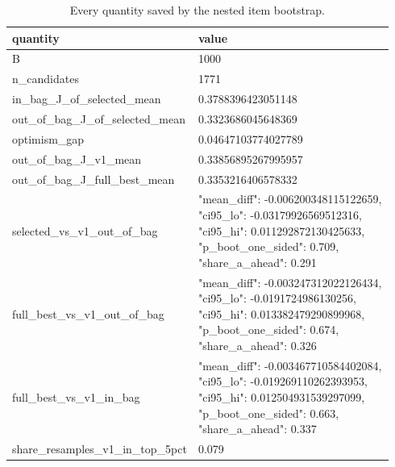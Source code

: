 \scriptsize
\setlength{\tabcolsep}{3pt}
\begin{longtable}{p{0.281\linewidth}p{0.661\linewidth}}
\caption{Every quantity saved by the nested item bootstrap.}\label{tab:nested_selection}\\
\toprule
quantity & value \\
\midrule
B & 1000 \\
n\_\allowbreak{}candidates & 1771 \\
in\_\allowbreak{}bag\_\allowbreak{}J\_\allowbreak{}of\_\allowbreak{}selected\_\allowbreak{}mean & 0.3788396423051148 \\
out\_\allowbreak{}of\_\allowbreak{}bag\_\allowbreak{}J\_\allowbreak{}of\_\allowbreak{}selected\_\allowbreak{}mean & 0.3323686045648369 \\
optimism\_\allowbreak{}gap & 0.04647103774027789 \\
out\_\allowbreak{}of\_\allowbreak{}bag\_\allowbreak{}J\_\allowbreak{}v1\_\allowbreak{}mean & 0.33856895267995957 \\
out\_\allowbreak{}of\_\allowbreak{}bag\_\allowbreak{}J\_\allowbreak{}full\_\allowbreak{}best\_\allowbreak{}mean & 0.3353216406578332 \\
selected\_\allowbreak{}vs\_\allowbreak{}v1\_\allowbreak{}out\_\allowbreak{}of\_\allowbreak{}bag & {"mean\_\allowbreak{}diff": -0.006200348115122659, "ci95\_\allowbreak{}lo": -0.03179926569512316, "ci95\_\allowbreak{}hi": 0.011292872130425633, "p\_\allowbreak{}boot\_\allowbreak{}one\_\allowbreak{}sided": 0.709, "share\_\allowbreak{}a\_\allowbreak{}ahead": 0.291} \\
full\_\allowbreak{}best\_\allowbreak{}vs\_\allowbreak{}v1\_\allowbreak{}out\_\allowbreak{}of\_\allowbreak{}bag & {"mean\_\allowbreak{}diff": -0.003247312022126434, "ci95\_\allowbreak{}lo": -0.0191724986130256, "ci95\_\allowbreak{}hi": 0.013382479290899968, "p\_\allowbreak{}boot\_\allowbreak{}one\_\allowbreak{}sided": 0.674, "share\_\allowbreak{}a\_\allowbreak{}ahead": 0.326} \\
full\_\allowbreak{}best\_\allowbreak{}vs\_\allowbreak{}v1\_\allowbreak{}in\_\allowbreak{}bag & {"mean\_\allowbreak{}diff": -0.003467710584402084, "ci95\_\allowbreak{}lo": -0.019269110262393953, "ci95\_\allowbreak{}hi": 0.012504931539297099, "p\_\allowbreak{}boot\_\allowbreak{}one\_\allowbreak{}sided": 0.663, "share\_\allowbreak{}a\_\allowbreak{}ahead": 0.337} \\
share\_\allowbreak{}resamples\_\allowbreak{}v1\_\allowbreak{}in\_\allowbreak{}top\_\allowbreak{}5pct & 0.079 \\

\end{longtable}
